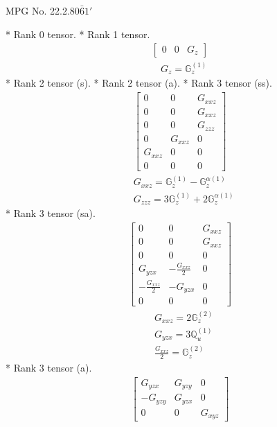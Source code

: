 \documentclass[fleqn,8pt,landscape]{jsarticle}
\begin{document}
\setcounter{MaxMatrixCols}{32}

\renewcommand{\tablename}{Table~}
\renewcommand{\figurename}{Figure~}
\begin{center}
\LARGE
MPG No. 22.2.80\quad$\bar{6}1'$
\end{center}
* Rank 0 tensor.
* Rank 1 tensor.
\begin{align*}
\begin{bmatrix} 0 & 0 & G_{z} \end{bmatrix}
\end{align*}
\begin{align*}
& G_{z} = \mathbb{G}_{z}^{(1)}
\end{align*}
* Rank 2 tensor (s).
* Rank 2 tensor (a).
* Rank 3 tensor (ss).
\begin{align*}
\begin{bmatrix} 0 & 0 & G_{xxz} \\ 0 & 0 & G_{xxz} \\ 0 & 0 & G_{zzz} \\ 0 & G_{xxz} & 0 \\ G_{xxz} & 0 & 0 \\ 0 & 0 & 0 \end{bmatrix}
\end{align*}
\begin{align*}
& G_{xxz} = \mathbb{G}_{z}^{(1)} - \mathbb{G}_{z}^{\alpha(1)} \\
& G_{zzz} = 3 \mathbb{G}_{z}^{(1)} + 2 \mathbb{G}_{z}^{\alpha(1)}
\end{align*}
* Rank 3 tensor (sa).
\begin{align*}
\begin{bmatrix} 0 & 0 & G_{xxz} \\ 0 & 0 & G_{xxz} \\ 0 & 0 & 0 \\ G_{yzx} & - \frac{G_{xxz}}{2} & 0 \\ - \frac{G_{xxz}}{2} & - G_{yzx} & 0 \\ 0 & 0 & 0 \end{bmatrix}
\end{align*}
\begin{align*}
& G_{xxz} = 2 \mathbb{G}_{z}^{(2)} \\
& G_{yzx} = 3 \mathbb{Q}_{u}^{(1)} \\
& \frac{G_{xxz}}{2} = \mathbb{G}_{z}^{(2)}
\end{align*}
* Rank 3 tensor (a).
\begin{align*}
\begin{bmatrix} G_{yzx} & G_{yzy} & 0 \\ - G_{yzy} & G_{yzx} & 0 \\ 0 & 0 & G_{xyz} \end{bmatrix}
\end{align*}
\end{document}
